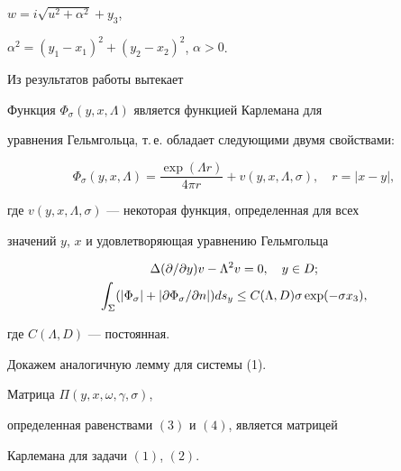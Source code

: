 $w=i\sqrt{u^2+\alpha^2}+y_3$, 


$\alpha^2=(y_1-x_1)^2+(y_2-x_2)^2$, $\alpha>0$. 


 


Из результатов работы \cite{4} вытекает 


 


\begin{lem} 


Функция $\Phi_\sigma(y,x,\Lambda)$ является функцией Карлемана для 


уравнения Гельмгольца, т.\,е. обладает следующими двумя свойствами$:$ 


\begin{equation} 


\Phi_\sigma(y,x,\Lambda)=\frac{\exp(\Lambda r)}{4\pi r} 


+v(y,x,\Lambda,\sigma),\quad r=|x-y|, 


\end{equation} 


где $v(y,x,\Lambda,\sigma)$ --- некоторая функция, определенная для всех 


значений $y$, $x$ и удовлетворяющая уравнению Гельмгольца 


\begin{gather} 


\Delta(\partial/\partial y)v-\Lambda^2v=0,\quad y\in D;\notag \\


\int_\Sigma(|\Phi_\sigma|+|\partial\Phi_\sigma/ 


\partial n|)ds_y\le C(\Lambda,D)\sigma\exp(-\sigma x_3), 


\end{gather} 


где $C(\Lambda,D)$ --- постоянная. 


\end{lem} 


 


Докажем аналогичную лемму для системы (1). 


 


\begin{lem} 


Матрица $\Pi(y,x,\omega,\gamma,\sigma)$, 


определенная равенствами $(3)$ и $(4)$, является матрицей 


Карлемана для задачи $(1)$, $(2)$. 


\end{lem} 


